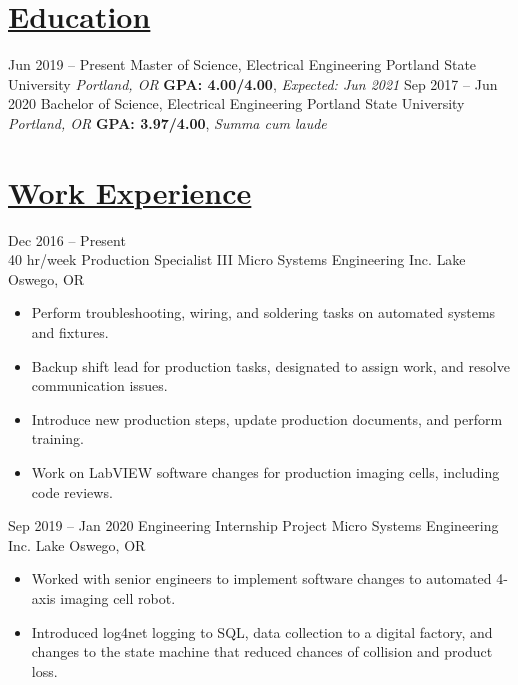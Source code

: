 \documentclass[letterpaper]{moderncv}        %
\begin{document}
\makecvtitle
\vspace*{-.8cm}
    
\section{\underline{Education}}

\cventry
{Jun 2019 -- Present}
{Master of Science, Electrical Engineering}
{Portland State University}
{\textit{Portland, OR}}
{}
{\textbf{GPA: 4.00/4.00}, \textit{Expected: Jun 2021}}
{}
\cventry
{Sep 2017 -- Jun 2020}
{Bachelor of Science, Electrical Engineering}
{Portland State University}
{\textit{Portland, OR}}
{}
{\textbf{GPA: 3.97/4.00}, \textit{Summa cum laude}}
{}

\section{\underline{Work Experience}}
\cventry
{Dec 2016 -- Present\\40 hr/week}
{Production Specialist III}
{Micro Systems Engineering Inc.}
{Lake Oswego, OR}
{}
{\begin{itemize}%
		\item Perform troubleshooting, wiring, and soldering tasks on automated systems and fixtures.
		\item Backup shift lead for production tasks, designated to assign work, and resolve communication issues.
		\item Introduce new production steps, update production documents, and perform training.
		\item Work on LabVIEW software changes for production imaging cells, including code reviews.
	\end{itemize}}
	
\cventry
{Sep 2019 -- Jan 2020}
{Engineering Internship Project}
{Micro Systems Engineering Inc.}
{Lake Oswego, OR}
{}
{\begin{itemize}%
 \item Worked with senior engineers to implement software changes to automated 4-axis imaging cell robot.
 \item Introduced log4net logging to SQL, data collection to a digital factory, and changes to the state machine that reduced chances of collision and product loss.
	\end{itemize}}
	
\end{document}
